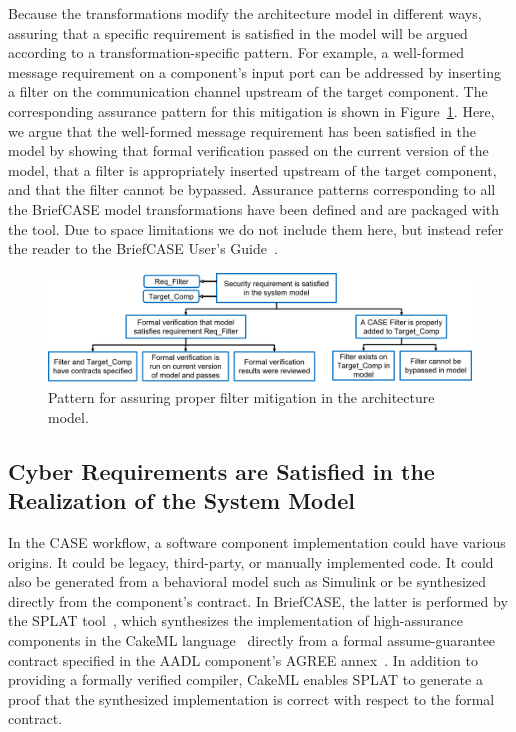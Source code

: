 Because the transformations modify the architecture model in different ways, assuring that a specific requirement is satisfied in the model will be argued according to a transformation-specific pattern.  For example, a well-formed message requirement on a component's input port can be addressed by inserting a filter on the communication channel upstream of the target component.  The corresponding assurance pattern for this mitigation is shown in Figure~\ref{fig:filter}.  Here, we argue that the well-formed message requirement has been satisfied in the model by showing that formal verification passed on the current version of the model, that a filter is appropriately inserted upstream of the target component, and that the filter cannot be bypassed.  Assurance patterns corresponding to all the BriefCASE model transformations have been defined and are packaged with the tool.  Due to space limitations we do not include them here, but instead refer the reader to the BriefCASE User's Guide~\cite{BriefCASE-user-guide}.

\begin{figure}[h] 
	\centering 
	\includegraphics[width=\textwidth]{figs/filter.png}
	\caption{Pattern for assuring proper filter mitigation in the architecture model.}
	\label{fig:filter} 
\end{figure}

\subsection{Cyber Requirements are Satisfied in the Realization of the System Model}

In the CASE workflow, a software component implementation could have various origins.  It could be legacy, third-party, or manually implemented code. It could also be generated from a behavioral model such as Simulink or be synthesized directly from the component's contract.  In BriefCASE, the latter is performed by the SPLAT tool~\cite{case-verified-filter}, which synthesizes the implementation of high-assurance components in the CakeML language~\cite{cakeml} directly from a formal assume-guarantee contract specified in the AADL component's AGREE annex~\cite{compositional-analysis-agree}.  In addition to providing a formally verified compiler, CakeML enables SPLAT to generate a proof that the synthesized implementation is correct with respect to the formal contract.

